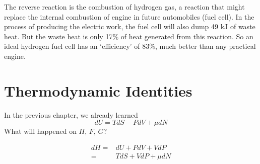 The reverse reaction is the combustion of hydrogen gas, a reaction that might replace the internal combustion of engine in future automobiles (fuel cell).
In the process of producing the electric work, the fuel cell will also dump 49 kJ of waste heat.
But the waste heat is only 17\% of heat generated from this reaction. So an ideal hydrogen fuel cell has an `efficiency' of 83\%, much better than any practical engine.




\section{Thermodynamic Identities}
In the previous chapter, we already learned
\begin{equation} dU = TdS - PdV + \mu dN \end{equation}
What will happened on $H$, $F$, $G$?

\begin{equation} 
\begin{split}
dH  = &  dU + PdV + VdP   \\
    = & TdS + VdP + \mu dN 
\end{split}
\end{equation}

